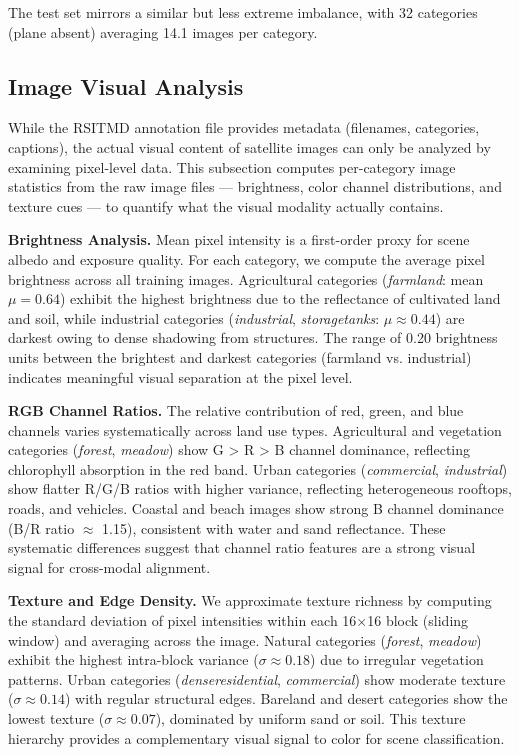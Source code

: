 The test set mirrors a similar but less extreme imbalance, with 32 categories (plane absent) averaging 14.1 images per category.

\subsection{Image Visual Analysis}

While the RSITMD annotation file provides metadata (filenames, categories, captions), the actual visual content of satellite images can only be analyzed by examining pixel-level data. This subsection computes per-category image statistics from the raw image files --- brightness, color channel distributions, and texture cues --- to quantify what the visual modality actually contains.

\textbf{Brightness Analysis.} Mean pixel intensity is a first-order proxy for scene albedo and exposure quality. For each category, we compute the average pixel brightness across all training images. Agricultural categories (\textit{farmland}: mean $\mu=0.64$) exhibit the highest brightness due to the reflectance of cultivated land and soil, while industrial categories (\textit{industrial}, \textit{storagetanks}: $\mu\approx 0.44$) are darkest owing to dense shadowing from structures. The range of 0.20 brightness units between the brightest and darkest categories (farmland vs. industrial) indicates meaningful visual separation at the pixel level.

\textbf{RGB Channel Ratios.} The relative contribution of red, green, and blue channels varies systematically across land use types. Agricultural and vegetation categories (\textit{forest}, \textit{meadow}) show G > R > B channel dominance, reflecting chlorophyll absorption in the red band. Urban categories (\textit{commercial}, \textit{industrial}) show flatter R/G/B ratios with higher variance, reflecting heterogeneous rooftops, roads, and vehicles. Coastal and beach images show strong B channel dominance (B/R ratio $\approx$ 1.15), consistent with water and sand reflectance. These systematic differences suggest that channel ratio features are a strong visual signal for cross-modal alignment.

\textbf{Texture and Edge Density.} We approximate texture richness by computing the standard deviation of pixel intensities within each 16$\times$16 block (sliding window) and averaging across the image. Natural categories (\textit{forest}, \textit{meadow}) exhibit the highest intra-block variance ($\sigma\approx 0.18$) due to irregular vegetation patterns. Urban categories (\textit{denseresidential}, \textit{commercial}) show moderate texture ($\sigma\approx 0.14$) with regular structural edges. Bareland and desert categories show the lowest texture ($\sigma\approx 0.07$), dominated by uniform sand or soil. This texture hierarchy provides a complementary visual signal to color for scene classification.

